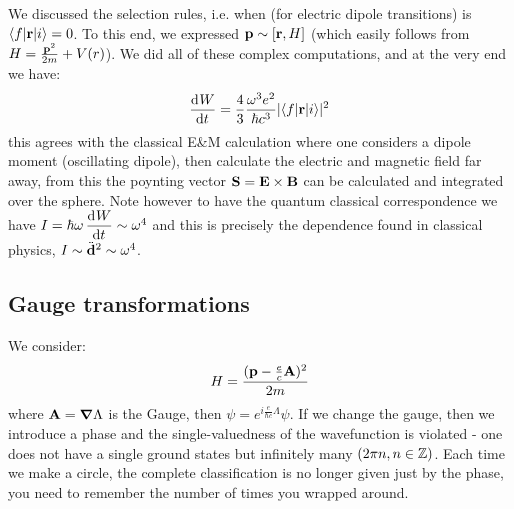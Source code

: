 We discussed the selection rules, i.e. when (for electric dipole transitions) is $\langle f \rvert\mathbf{r} \lvert i \rangle = 0$. To this end, we expressed $\mathbf{p} \sim [\mathbf{r}, H]$ (which easily follows from $H = \frac{\mathbf{p}^2}{2m} + V(r)$). We did all of these complex computations, and at the very end we have:
\begin{equation}
    \dod{W}{t} = \frac{4}{3}\frac{\omega^3e^2}{\hbar c^3}\abs{\bra{f}\v{r}\ket{i}}^2
\end{equation}
this agrees with the classical E\&M calculation where one considers a dipole moment (oscillating dipole), then calculate the electric and magnetic field far away, from this the poynting vector $\mathbf{S} = \mathbf{E} \times \mathbf{B}$ can be calculated and integrated over the sphere. Note however to have the quantum classical correspondence we have $I = \hbar \omega \dod{W}{t} \sim \omega^4$ and this is precisely the dependence found in classical physics, $I \sim \ddot{\mathbf{d}}^2 \sim \omega^4$. 

\subsection{Gauge transformations}
We consider:
\begin{equation}
    H = \frac{(\mathbf{p} - \frac{e}{c}\mathbf{A})^2}{2m}
\end{equation}
where $\v{A} = \nabla \Lambda$ is the Gauge, then $\psi = e^{i\frac{e}{\hbar c}\Lambda}\psi$. If we change the gauge, then we introduce a phase and the single-valuedness of the wavefunction is violated - one does not have a single ground states but infinitely many $(2\pi n, n \in \mathbb{Z})$. Each time we make a circle, the complete classification is no longer given just by the phase, you need to remember the number of times you wrapped around.